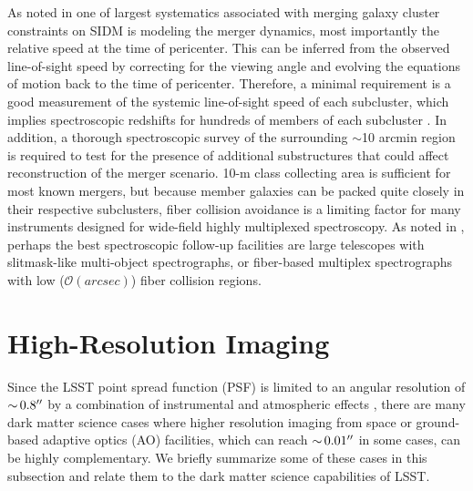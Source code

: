 As noted in  one of largest systematics associated with merging galaxy cluster constraints on SIDM is modeling the merger dynamics, most importantly the relative speed at the time of
pericenter. This can be inferred from the observed line-of-sight speed by correcting for the viewing angle and evolving the equations of motion back to the time of pericenter. Therefore, a minimal requirement is a good measurement of the systemic line-of-sight speed of each subcluster, which implies spectroscopic redshifts for hundreds of members of each subcluster \citep[\eg,][]{Golovich:2018}. In addition, a thorough spectroscopic survey of the surrounding $\sim$10 arcmin region is required to test for the presence of additional substructures that could affect reconstruction of the merger scenario. 10-m class collecting area is sufficient for most known mergers, but because member galaxies can be packed quite closely in their respective subclusters, fiber collision avoidance is a limiting factor for many instruments designed for wide-field highly multiplexed spectroscopy.  As noted in \citet{2016arXiv161001661N}, perhaps the best spectroscopic follow-up facilities are large telescopes with slitmask-like multi-object spectrographs, or fiber-based multiplex spectrographs with low ($\mathcal{O}(\unit{arcsec})$) fiber collision regions.

\section{High-Resolution Imaging }
\label{sec:highres}


Since the LSST point spread function (PSF) is limited to an angular resolution of $ {\sim}\, 0.8''$ by a combination of instrumental and  atmospheric effects \citep{0805.2366}, there are many dark matter science cases where higher resolution imaging from space or ground-based adaptive optics (AO) facilities, which can reach $ {\sim}\, 0.01''$ in some cases, can be highly complementary. We briefly summarize some of these cases in this subsection and relate them to the dark matter science capabilities of LSST.

